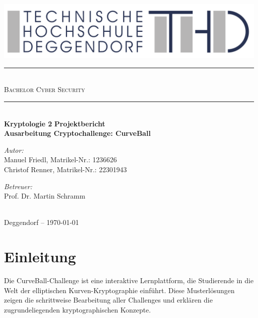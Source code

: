 \documentclass{article}
\begin{document}
\begin{titlepage}
  \begin{center}
    \includegraphics[width=\textwidth]{THD-Logo.pdf}
    \vspace{1cm}
    \rule{1\textwidth}{1mm} \\[0.3cm]
    \textsc{\scshape \huge Bachelor Cyber Security}\\
    \rule{1\textwidth}{1mm} \\[2cm]
    {
      \vspace{1cm}
      \Large \textbf{Kryptologie 2}
      \vspace{3cm}
      \Large \textbf{Projektbericht}
    }\\[0.5cm]
    \LARGE \textbf{Ausarbeitung Cryptochallenge: CurveBall}\\[2cm]
    \begin{minipage}[t]{0.4\textwidth}
      \begin{flushleft}
        \normalsize \emph{Autor:}\\[0.3cm]
        Manuel Friedl, Matrikel-Nr.: 1236626\\
        Christof Renner, Matrikel-Nr.: 22301943
      \end{flushleft}
    \end{minipage}
    \begin{minipage}[t]{0.5\textwidth}
      \begin{flushright}
        \normalsize \emph{Betreuer:}\\[0.3cm]
        Prof. Dr. Martin Schramm
      \end{flushright}
    \end{minipage}\\[3cm]
    {\large Deggendorf – \today\\}
  \end{center}
\end{titlepage}

\newpage
{}

\newpage
\tableofcontents
\newpage


\section{Einleitung}
Die CurveBall-Challenge ist eine interaktive Lernplattform, die Studierende in die Welt der elliptischen Kurven-Kryptographie einführt. Diese Musterlösungen zeigen die schrittweise Bearbeitung aller Challenges und erklären die zugrundeliegenden kryptographischen Konzepte.
\end{document}
